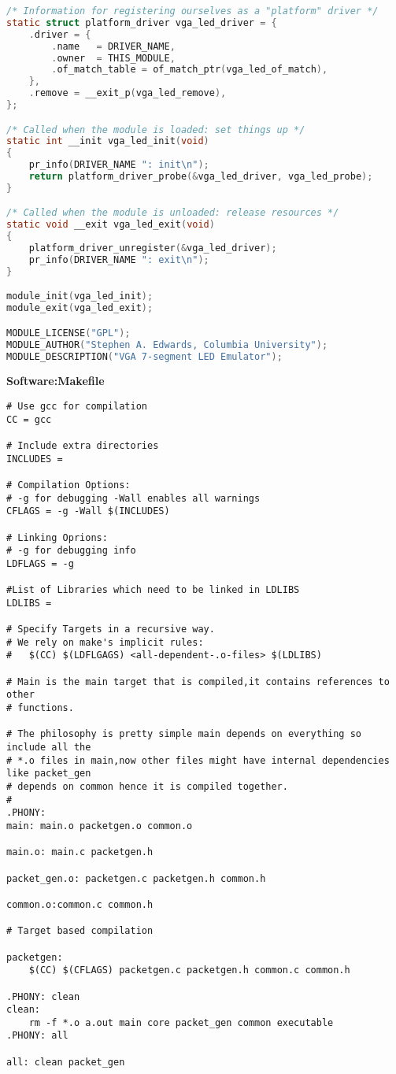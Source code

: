 \documentclass[twoside,12pt,fleqn]{book} %
\begin{document}
\begin{lstlisting}[language=C]
/* Information for registering ourselves as a "platform" driver */
static struct platform_driver vga_led_driver = {
	.driver	= {
		.name	= DRIVER_NAME,
		.owner	= THIS_MODULE,
		.of_match_table = of_match_ptr(vga_led_of_match),
	},
	.remove	= __exit_p(vga_led_remove),
};

/* Called when the module is loaded: set things up */
static int __init vga_led_init(void)
{
	pr_info(DRIVER_NAME ": init\n");
	return platform_driver_probe(&vga_led_driver, vga_led_probe);
}

/* Called when the module is unloaded: release resources */
static void __exit vga_led_exit(void)
{
	platform_driver_unregister(&vga_led_driver);
	pr_info(DRIVER_NAME ": exit\n");
}

module_init(vga_led_init);
module_exit(vga_led_exit);

MODULE_LICENSE("GPL");
MODULE_AUTHOR("Stephen A. Edwards, Columbia University");
MODULE_DESCRIPTION("VGA 7-segment LED Emulator");
\end{lstlisting}
\newpage
\textbf{Software:Makefile}
\begin{lstlisting}
# Use gcc for compilation
CC = gcc

# Include extra directories
INCLUDES = 

# Compilation Options:
# -g for debugging -Wall enables all warnings
CFLAGS = -g -Wall $(INCLUDES)

# Linking Oprions:
# -g for debugging info
LDFLAGS = -g

#List of Libraries which need to be linked in LDLIBS
LDLIBS = 

# Specify Targets in a recursive way.
# We rely on make's implicit rules:
# 	$(CC) $(LDFLGAGS) <all-dependent-.o-files> $(LDLIBS)

# Main is the main target that is compiled,it contains references to other
# functions.

# The philosophy is pretty simple main depends on everything so include all the
# *.o files in main,now other files might have internal dependencies like packet_gen 
# depends on common hence it is compiled together.
#
.PHONY:
main: main.o packetgen.o common.o  

main.o: main.c packetgen.h

packet_gen.o: packetgen.c packetgen.h common.h

common.o:common.c common.h

# Target based compilation

packetgen:
	$(CC) $(CFLAGS) packetgen.c packetgen.h common.c common.h

.PHONY: clean
clean:
	rm -f *.o a.out main core packet_gen common executable
.PHONY: all

all: clean packet_gen
\end{lstlisting}
\end{document}
